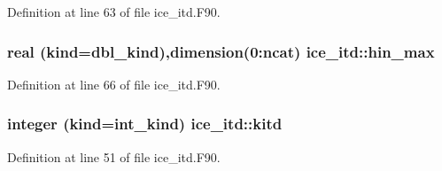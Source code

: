 Definition at line 63 of file ice\_\-itd.F90.\hypertarget{namespaceice__itd_aa7b9ac33772390c73597dec2ed768aba}{
\subsubsection[{hin\_\-max}]{\setlength{\rightskip}{0pt plus 5cm}real (kind=dbl\_\-kind),dimension(0:ncat) {\bf ice\_\-itd::hin\_\-max}}}
\label{namespaceice__itd_aa7b9ac33772390c73597dec2ed768aba}


Definition at line 66 of file ice\_\-itd.F90.\hypertarget{namespaceice__itd_abda5299945828ac5cca9a7e6522991e3}{
\subsubsection[{kitd}]{\setlength{\rightskip}{0pt plus 5cm}integer (kind=int\_\-kind) {\bf ice\_\-itd::kitd}}}
\label{namespaceice__itd_abda5299945828ac5cca9a7e6522991e3}


Definition at line 51 of file ice\_\-itd.F90.